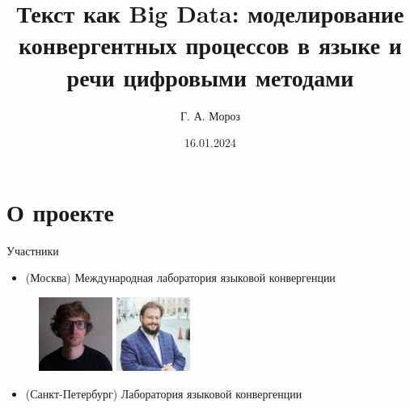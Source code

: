 \documentclass[
  13pt,
  ignorenonframetext,
]{beamer}
\title{Текст как Big Data: моделирование конвергентных процессов в языке
и речи цифровыми методами}
\author{Г. А. Мороз}
\date{16.01.2024}
\providecommand{\tightlist}{%
  \setlength{\itemsep}{0pt}\setlength{\parskip}{0pt}}\usepackage{longtable,booktabs,array}
\begin{document}
\frame{\titlepage}

\section{О проекте}\label{ux43e-ux43fux440ux43eux435ux43aux442ux435}

\begin{frame}{Участники}
\label{ux443ux447ux430ux441ux442ux43dux438ux43aux438}
\begin{itemize}
\tightlist
\item
  (Москва) Международная лаборатория языковой конвергенции
\end{itemize}

\begin{figure}

\begin{minipage}{0.50\linewidth}

\includegraphics[width=0.95in,height=\textheight]{images/gm.jpeg}

\end{minipage}%
%
\begin{minipage}{0.50\linewidth}

\includegraphics[width=0.95in,height=\textheight]{images/bo.jpeg}

\end{minipage}%

\end{figure}%

\begin{itemize}
\tightlist
\item
  (Санкт-Петербург) Лаборатория языковой конвергенции
\end{itemize}

\begin{figure}

\begin{minipage}{0.50\linewidth}


\end{minipage}
\end{figure}
\end{frame}
\end{document}
